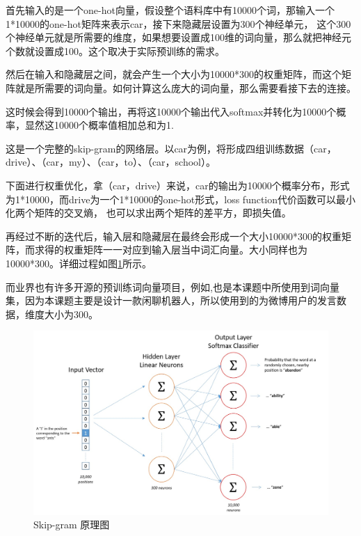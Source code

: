 \documentclass[supercite]{HustGraduPaper}
\theoremstyle{definition}
\begin{document}
首先输入的是一个one-hot向量，假设整个语料库中有10000个词，那输入一个1*10000的one-hot矩阵来表示car，接下来隐藏层设置为300个神经单元，
这个300个神经单元就是所需要的维度，如果想要设置成100维的词向量，那么就把神经元个数就设置成100。这个取决于实际预训练的需求。

然后在输入和隐藏层之间，就会产生一个大小为10000*300的权重矩阵，而这个矩阵就是所需要的词向量。如何计算这么庞大的词向量，那么需要看接下去的连接。

这时候会得到10000个输出，再将这10000个输出代入softmax并转化为10000个概率，显然这10000个概率值相加总和为1.

这是一个完整的skip-gram的网络层。以car为例，将形成四组训练数据（car，drive）、（car，my）、（car，to）、（car，school）。

下面进行权重优化，拿（car，drive）来说，car的输出为10000个概率分布，形式为1*10000，而drive为一个1*10000的one-hot形式，loss function代价函数可以最小化两个矩阵的交叉熵，
也可以求出两个矩阵的差平方，即损失值。

再经过不断的迭代后，输入层和隐藏层在最终会形成一个大小10000*300的权重矩阵，而求得的权重矩阵一一对应到输入层当中词汇向量。大小同样也为10000*300。详细过程如图\ref{Fig.skipgram}所示。

而业界也有许多开源的预训练词向量项目，例如\cite{wordvector},也是本课题中所使用到词向量集，因为本课题主要是设计一款闲聊机器人，所以使用到的为微博用户的发言数据，维度大小为300。

\begin{figure}[htbp] %
  \centering %
  \includegraphics[width=1\textwidth]{images/skip-gram.png} %
  \caption{Skip-gram 原理图} %
  \label{Fig.skipgram} %
\end{figure}
\end{document}
